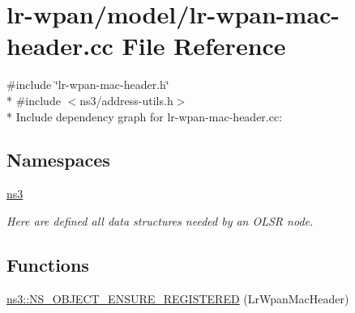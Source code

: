 \hypertarget{lr-wpan-mac-header_8cc}{}\section{lr-\/wpan/model/lr-\/wpan-\/mac-\/header.cc File Reference}
\label{lr-wpan-mac-header_8cc}
{\ttfamily \#include \char`\"{}lr-\/wpan-\/mac-\/header.\+h\char`\"{}}\\*
{\ttfamily \#include $<$ns3/address-\/utils.\+h$>$}\\*
Include dependency graph for lr-\/wpan-\/mac-\/header.cc\+:
\subsection*{Namespaces}
\begin{DoxyCompactItemize}
\item 
 \hyperlink{namespacens3}{ns3}
\begin{DoxyCompactList}\small\item\em Here are defined all data structures needed by an O\+L\+SR node. \end{DoxyCompactList}\end{DoxyCompactItemize}
\subsection*{Functions}
\begin{DoxyCompactItemize}
\item 
\hyperlink{namespacens3_aa7c2544268f8d096b2b794aa53c6b180}{ns3\+::\+N\+S\+\_\+\+O\+B\+J\+E\+C\+T\+\_\+\+E\+N\+S\+U\+R\+E\+\_\+\+R\+E\+G\+I\+S\+T\+E\+R\+ED} (Lr\+Wpan\+Mac\+Header)
\end{DoxyCompactItemize}

